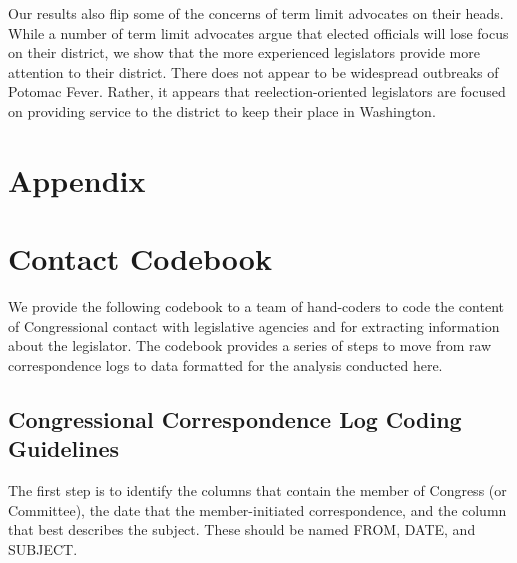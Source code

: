 \documentclass[12pt]{article}
\begin{document}
Our results also flip some of the concerns of term limit advocates on their heads. While a number of term limit advocates argue that elected officials will lose focus on their district, we show that the more experienced legislators provide more attention to their district. There does not appear to be widespread outbreaks of Potomac Fever. Rather, it appears that reelection-oriented legislators are focused on providing service to the district to keep their place in Washington.  





\clearpage
\appendix
\setcounter{table}{0}
\renewcommand{\thetable}{A\arabic{table}}

\section*{Appendix}




\section{Contact Codebook} \label{a:codebook}
\singlespacing

We provide the following codebook to a team of hand-coders to code the content of Congressional contact with legislative agencies and for extracting information about the legislator. The codebook provides a series of steps to move from raw correspondence logs to data formatted for the analysis conducted here.  

\subsection{Congressional Correspondence Log Coding Guidelines}

The first step is to identify the columns that contain the member of Congress (or Committee), the date that the member-initiated correspondence, and the column that best describes the subject. These should be named FROM, DATE, and SUBJECT. 
\end{document}
